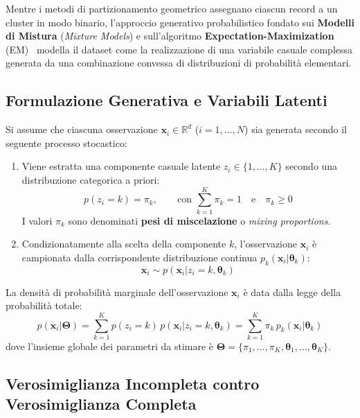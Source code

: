 Mentre i metodi di partizionamento geometrico assegnano ciascun record a un cluster in modo binario, l'approccio generativo probabilistico fondato sui \textbf{Modelli di Mistura} (\textit{Mixture Models}) e sull'algoritmo \textbf{Expectation-Maximization} (EM)~\cite{dempster1977} modella il dataset come la realizzazione di una variabile casuale complessa generata da una combinazione convessa di distribuzioni di probabilità elementari.

\FloatBarrier
\subsection{Formulazione Generativa e Variabili Latenti}

Si assume che ciascuna osservazione $\mathbf{x}_i \in \mathbb{R}^d$ ($i = 1, \dots, N$) sia generata secondo il seguente processo stocastico:
\begin{enumerate}
    \item Viene estratta una componente casuale latente $z_i \in \{1, \dots, K\}$ secondo una distribuzione categorica a priori:
    \begin{equation}
    p(z_i = k) = \pi_k, \qquad \text{con } \sum_{k=1}^K \pi_k = 1 \quad \text{e} \quad \pi_k \ge 0
    \end{equation}
    I valori $\pi_k$ sono denominati \textbf{pesi di miscelazione} o \textit{mixing proportions}.
    \item Condizionatamente alla scelta della componente $k$, l'osservazione $\mathbf{x}_i$ è campionata dalla corrispondente distribuzione continua $p_k(\mathbf{x}_i | \boldsymbol{\theta}_k)$:
    \begin{equation}
    \mathbf{x}_i \sim p(\mathbf{x}_i | z_i = k, \boldsymbol{\theta}_k)
    \end{equation}
\end{enumerate}
La densità di probabilità marginale dell'osservazione $\mathbf{x}_i$ è data dalla legge della probabilità totale:
\begin{equation}
\label{eq:dm-mixture-marginal-density}
p(\mathbf{x}_i | \boldsymbol{\Theta}) = \sum_{k=1}^K p(z_i = k) \, p(\mathbf{x}_i | z_i = k, \boldsymbol{\theta}_k) = \sum_{k=1}^K \pi_k \, p_k(\mathbf{x}_i | \boldsymbol{\theta}_k)
\end{equation}
dove l'insieme globale dei parametri da stimare è $\boldsymbol{\Theta} = \{\pi_1, \dots, \pi_K, \boldsymbol{\theta}_1, \dots, \boldsymbol{\theta}_K\}$.

\FloatBarrier
\subsection{Verosimiglianza Incompleta contro Verosimiglianza Completa}

